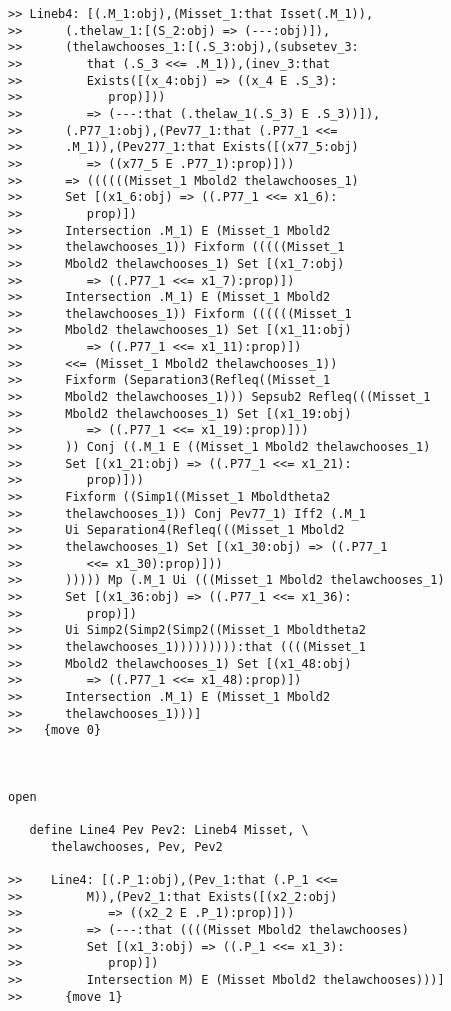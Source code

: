 \documentclass[12pt]{article}
\begin{document}
\begin{verbatim}
>> Lineb4: [(.M_1:obj),(Misset_1:that Isset(.M_1)),
>>      (.thelaw_1:[(S_2:obj) => (---:obj)]),
>>      (thelawchooses_1:[(.S_3:obj),(subsetev_3:
>>         that (.S_3 <<= .M_1)),(inev_3:that
>>         Exists([(x_4:obj) => ((x_4 E .S_3):
>>            prop)]))
>>         => (---:that (.thelaw_1(.S_3) E .S_3))]),
>>      (.P77_1:obj),(Pev77_1:that (.P77_1 <<=
>>      .M_1)),(Pev277_1:that Exists([(x77_5:obj)
>>         => ((x77_5 E .P77_1):prop)]))
>>      => ((((((Misset_1 Mbold2 thelawchooses_1)
>>      Set [(x1_6:obj) => ((.P77_1 <<= x1_6):
>>         prop)])
>>      Intersection .M_1) E (Misset_1 Mbold2
>>      thelawchooses_1)) Fixform (((((Misset_1
>>      Mbold2 thelawchooses_1) Set [(x1_7:obj)
>>         => ((.P77_1 <<= x1_7):prop)])
>>      Intersection .M_1) E (Misset_1 Mbold2
>>      thelawchooses_1)) Fixform ((((((Misset_1
>>      Mbold2 thelawchooses_1) Set [(x1_11:obj)
>>         => ((.P77_1 <<= x1_11):prop)])
>>      <<= (Misset_1 Mbold2 thelawchooses_1))
>>      Fixform (Separation3(Refleq((Misset_1
>>      Mbold2 thelawchooses_1))) Sepsub2 Refleq(((Misset_1
>>      Mbold2 thelawchooses_1) Set [(x1_19:obj)
>>         => ((.P77_1 <<= x1_19):prop)]))
>>      )) Conj ((.M_1 E ((Misset_1 Mbold2 thelawchooses_1)
>>      Set [(x1_21:obj) => ((.P77_1 <<= x1_21):
>>         prop)]))
>>      Fixform ((Simp1((Misset_1 Mboldtheta2
>>      thelawchooses_1)) Conj Pev77_1) Iff2 (.M_1
>>      Ui Separation4(Refleq(((Misset_1 Mbold2
>>      thelawchooses_1) Set [(x1_30:obj) => ((.P77_1
>>         <<= x1_30):prop)]))
>>      ))))) Mp (.M_1 Ui (((Misset_1 Mbold2 thelawchooses_1)
>>      Set [(x1_36:obj) => ((.P77_1 <<= x1_36):
>>         prop)])
>>      Ui Simp2(Simp2(Simp2((Misset_1 Mboldtheta2
>>      thelawchooses_1))))))))):that ((((Misset_1
>>      Mbold2 thelawchooses_1) Set [(x1_48:obj)
>>         => ((.P77_1 <<= x1_48):prop)])
>>      Intersection .M_1) E (Misset_1 Mbold2
>>      thelawchooses_1)))]
>>   {move 0}



open

   define Line4 Pev Pev2: Lineb4 Misset, \
      thelawchooses, Pev, Pev2

>>    Line4: [(.P_1:obj),(Pev_1:that (.P_1 <<=
>>         M)),(Pev2_1:that Exists([(x2_2:obj)
>>            => ((x2_2 E .P_1):prop)]))
>>         => (---:that ((((Misset Mbold2 thelawchooses)
>>         Set [(x1_3:obj) => ((.P_1 <<= x1_3):
>>            prop)])
>>         Intersection M) E (Misset Mbold2 thelawchooses)))]
>>      {move 1}




\end{verbatim}
\end{document}
